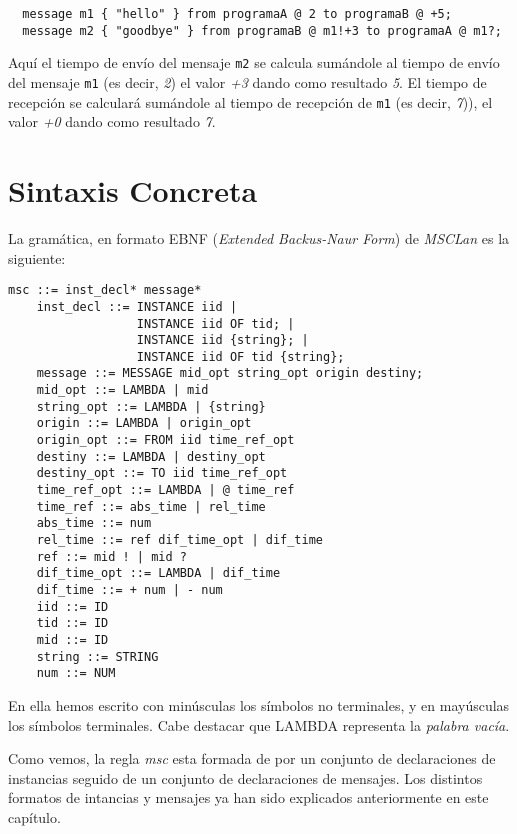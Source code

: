 \begin{itemize}
  \begin{lstlisting}
  message m1 { "hello" } from programaA @ 2 to programaB @ +5;
  message m2 { "goodbye" } from programaB @ m1!+3 to programaA @ m1?;
  \end{lstlisting}

  Aquí el tiempo de envío del mensaje \lstinline{m2} se calcula sumándole al tiempo de envío del
  mensaje \lstinline{m1} (es decir, \textit{2}) el valor \textit{+3}
  dando como resultado \textit{5}. El tiempo de recepción se calculará
  sumándole al tiempo de recepción de \lstinline{m1} (es decir,
  \textit{7})), el valor \textit{+0} dando como resultado \textit{7}.
\end{itemize}


\section{Sintaxis Concreta}

La gramática, en formato EBNF (\emph{Extended Backus-Naur Form}) de
\textit{MSCLan} es la siguiente:
\begin{lstlisting}[style=spec, language={}]
    msc ::= inst_decl* message*
    inst_decl ::= INSTANCE iid |
                  INSTANCE iid OF tid; |
                  INSTANCE iid {string}; |
                  INSTANCE iid OF tid {string};               
    message ::= MESSAGE mid_opt string_opt origin destiny;
    mid_opt ::= LAMBDA | mid
    string_opt ::= LAMBDA | {string}
    origin ::= LAMBDA | origin_opt
    origin_opt ::= FROM iid time_ref_opt
    destiny ::= LAMBDA | destiny_opt
    destiny_opt ::= TO iid time_ref_opt
    time_ref_opt ::= LAMBDA | @ time_ref
    time_ref ::= abs_time | rel_time
    abs_time ::= num
    rel_time ::= ref dif_time_opt | dif_time
    ref ::= mid ! | mid ?
    dif_time_opt ::= LAMBDA | dif_time
    dif_time ::= + num | - num
    iid ::= ID
    tid ::= ID
    mid ::= ID
    string ::= STRING
    num ::= NUM
\end{lstlisting}

En ella hemos escrito con minúsculas los símbolos no terminales, y en 
mayúsculas los símbolos terminales. Cabe destacar que LAMBDA
representa la \textit{palabra vacía}.

Como vemos, la regla \textit{msc} esta formada de por un conjunto de
declaraciones de instancias seguido de un conjunto de declaraciones de
mensajes. Los distintos formatos de intancias y mensajes ya han sido
explicados anteriormente en este capítulo.

